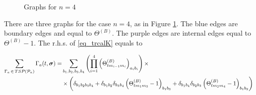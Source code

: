 \documentclass[10pt,reqno]{article}
\theoremstyle{plain} %
\theoremstyle{remark}
\numberwithin{equation}{section}
\begin{document}
\begin{figure}[ht]
{
    }
    \caption{Graphs for $n=4$}
    \label{fig_n=4}
\end{figure}
There are three graphs for the case $n = 4$, as in Figure \ref{fig_n=4}.  The blue edges are boundary edges and equal to $\Theta^{(B)}$. The purple edges are internal edges equal to  $\Theta^{(B)} - 1$.  The r.h.s. of \eqref{eq_trcalK} equals to 

\begin{align}\nonumber
\sum_{\Gamma_{\textbf{a}}\, \in\,  {TSP}({\cal P}_{\textbf{a}})} \Gamma_{ \textbf{a}}(t, \boldsymbol{\sigma})= & \sum_{b_1, b_2, b_3, b_4}  \left(\prod_{i=1}^4 \left(\Theta^{(B)}_{t m_{i-1} m_i}\right)_{a_i b_i}\right) \times
\\\nonumber
& \times \left( \delta_{b_1 b_2 b_3 b_4}
+ \delta_{b_1 b_2} \delta_{b_3 b_4} \left(\Theta^{(B)}_{t m_1 m_3} - 1\right)_{b_1 b_3}
+ \delta_{b_1 b_4} \delta_{b_2 b_3} \left(\Theta^{(B)}_{t m_2 m_4} - 1\right)_{b_1 b_2}\right)
\end{align}
\end{document}
